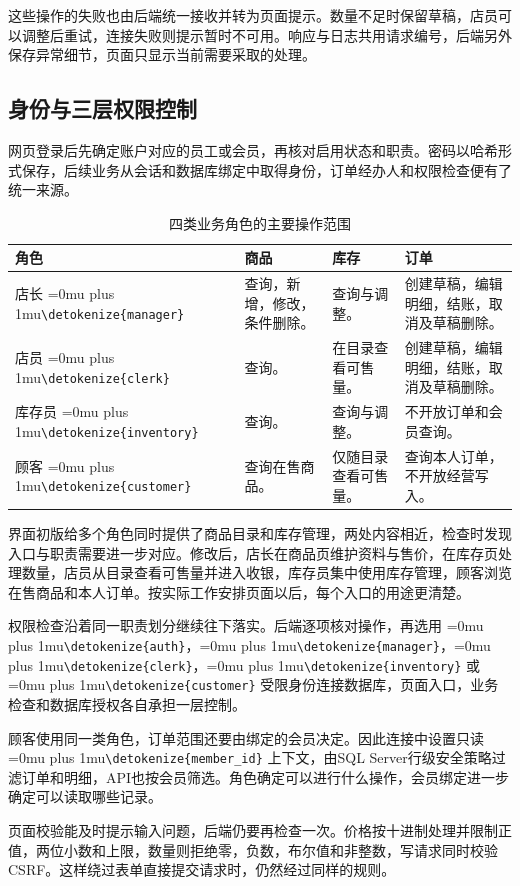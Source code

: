 \documentclass{SYSUReport}
\newcommand{\code}[1]{\begingroup\Urlmuskip=0mu plus 1mu\expandafter\nolinkurl\expandafter{\detokenize{#1}}\endgroup}
\begin{document}
这些操作的失败也由后端统一接收并转为页面提示。数量不足时保留草稿，店员可以调整后重试，连接失败则提示暂时不可用。响应与日志共用请求编号，后端另外保存异常细节，页面只显示当前需要采取的处理。

\medskip
\Needspace{0.72\textheight}
\subsection{身份与三层权限控制}
网页登录后先确定账户对应的员工或会员，再核对启用状态和职责。密码以哈希形式保存，后续业务从会话和数据库绑定中取得身份，订单经办人和权限检查便有了统一来源。

\begin{table}[H]\centering\small
\begin{tabularx}{\textwidth}{P{2.7cm}P{2.4cm}P{2.5cm}Y}
\toprule 角色 & 商品 & 库存 & 订单 \\
\midrule
店长 \code{manager} & 查询，新增，修改，条件删除。 & 查询与调整。 & 创建草稿，编辑明细，结账，取消及草稿删除。 \\
店员 \code{clerk} & 查询。 & 在目录查看可售量。 & 创建草稿，编辑明细，结账，取消及草稿删除。 \\
库存员 \code{inventory} & 查询。 & 查询与调整。 & 不开放订单和会员查询。 \\
顾客 \code{customer} & 查询在售商品。 & 仅随目录查看可售量。 & 查询本人订单，不开放经营写入。 \\
\bottomrule
\end{tabularx}\caption{四类业务角色的主要操作范围}
\end{table}

界面初版给多个角色同时提供了商品目录和库存管理，两处内容相近，检查时发现入口与职责需要进一步对应。修改后，店长在商品页维护资料与售价，在库存页处理数量，店员从目录查看可售量并进入收银，库存员集中使用库存管理，顾客浏览在售商品和本人订单。按实际工作安排页面以后，每个入口的用途更清楚。

权限检查沿着同一职责划分继续往下落实。后端逐项核对操作，再选用 \code{auth}，\code{manager}，\code{clerk}，\code{inventory} 或 \code{customer} 受限身份连接数据库，页面入口，业务检查和数据库授权各自承担一层控制。

顾客使用同一类角色，订单范围还要由绑定的会员决定。因此连接中设置只读 \code{member_id} 上下文，由SQL Server行级安全策略过滤订单和明细，API也按会员筛选。角色确定可以进行什么操作，会员绑定进一步确定可以读取哪些记录。

页面校验能及时提示输入问题，后端仍要再检查一次。价格按十进制处理并限制正值，两位小数和上限，数量则拒绝零，负数，布尔值和非整数，写请求同时校验CSRF。这样绕过表单直接提交请求时，仍然经过同样的规则。
\end{document}
